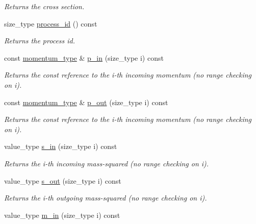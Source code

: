 \begin{DoxyCompactItemize}
\begin{DoxyCompactList}\small\item\em Returns the cross section. \end{DoxyCompactList}\item 
\hypertarget{a00430_a56d70495e4d75f6a59d719c11fd56129}{size\-\_\-type \hyperlink{a00430_a56d70495e4d75f6a59d719c11fd56129}{process\-\_\-id} () const }\label{a00430_a56d70495e4d75f6a59d719c11fd56129}

\begin{DoxyCompactList}\small\item\em Returns the process id. \end{DoxyCompactList}\item 
const \hyperlink{a00559}{momentum\-\_\-type} \& \hyperlink{a00430_a0f2d060d8fcaf550dc549107de16a117}{p\-\_\-in} (size\-\_\-type i) const 
\begin{DoxyCompactList}\small\item\em Returns the const reference to the i-\/th incoming momentum (no range checking on i). \end{DoxyCompactList}\item 
const \hyperlink{a00559}{momentum\-\_\-type} \& \hyperlink{a00430_ac83c742399331e972df1be65c587940e}{p\-\_\-out} (size\-\_\-type i) const 
\begin{DoxyCompactList}\small\item\em Returns the const reference to the i-\/th incoming momentum (no range checking on i). \end{DoxyCompactList}\item 
\hypertarget{a00430_a16d207fe275c80737368224ac03b0284}{value\-\_\-type \hyperlink{a00430_a16d207fe275c80737368224ac03b0284}{s\-\_\-in} (size\-\_\-type i) const }\label{a00430_a16d207fe275c80737368224ac03b0284}

\begin{DoxyCompactList}\small\item\em Returns the i-\/th incoming mass-\/squared (no range checking on i). \end{DoxyCompactList}\item 
\hypertarget{a00430_a2ed990d63db381ee1b2bedbe00dd56bf}{value\-\_\-type \hyperlink{a00430_a2ed990d63db381ee1b2bedbe00dd56bf}{s\-\_\-out} (size\-\_\-type i) const }\label{a00430_a2ed990d63db381ee1b2bedbe00dd56bf}

\begin{DoxyCompactList}\small\item\em Returns the i-\/th outgoing mass-\/squared (no range checking on i). \end{DoxyCompactList}\item 
\hypertarget{a00430_a0d7e11bb6847f807fa13aa38d27baf34}{value\-\_\-type \hyperlink{a00430_a0d7e11bb6847f807fa13aa38d27baf34}{m\-\_\-in} (size\-\_\-type i) const }\label{a00430_a0d7e11bb6847f807fa13aa38d27baf34}


\end{DoxyCompactItemize}
